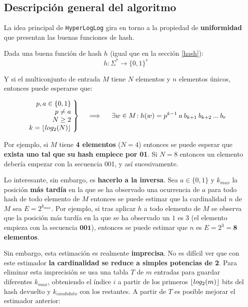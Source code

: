 \subsection{Descripción general del algoritmo}
\label{investigacion:descripcion}

La idea principal de \texttt{HyperLogLog} gira en torno a la propiedad de \textbf{uniformidad} que presentan las buenas
funciones de hash.

Dada una buena función de hash $h$ (igual que en la sección \ref{hash}):
$$h: \Sigma^* \rightarrow \{0,1\}^r$$

Y si el multiconjunto de entrada $M$ tiene $N$ elementos y $n$ elementos únicos, entonces puede esperarse que:

\begin{align*}
  \left.\begin{array}{r@{\mskip\thickmuskip}l}
    p, a \in \{0, 1\} \\
    p \neq a \\
    N \geq 2 \\
    k = \floor{log_2(N)}
  \end{array} \right\}
  \quad \implies \quad
  \left.
    \exists{w \in M}\!: h(w) = p^{k-1} \: a \: b_{k+1} \: b_{k+2} \: ... \: b_r
  \right.
\end{align*}

Por ejemplo, si $M$ tiene \textbf{4 elementos} ($N = 4$) entonces se puede esperar que \textbf{exista uno tal que su hash
empiece por 01}. Si $N = 8$ entonces un elemento debería empezar con la secuencia 001, y así sucesivamente.

Lo interesante, sin embargo, es \textbf{hacerlo a la inversa}.
Sea $a \in \{0, 1\}$ y $k_{max}$ la posición \textbf{más tardía} en la que se ha observado
una ocurrencia de $a$ para todo hash de todo elemento de $M$ entonces se puede estimar que la cardinalidad $n$ de $M$ sea $E = 2^{k_{max}}$.
Por ejemplo, si tras aplicar $h$ a todo elemento de $M$ se observa que la posición más tardía en la que se ha observado un
$1$ es 3 (el elemento empieza con la secuencia $\textbf{001}$), entonces se puede estimar que $n$ es $E = 2^3 = \textbf{8}$ \textbf{elementos}.

Sin embargo, esta estimación es realmente \textbf{imprecisa}. No es difícil ver que con este estimador
\textbf{la cardinalidad se reduce a simples potencias de 2}. Para eliminar esta imprecisión se usa una tabla $T$ de $m$ entradas
para guardar diferentes $k_{max}$, obteniendo el índice $i$ a partir de los primeros $\lfloor log_2(m)\rfloor$ bits del hash devuelto
y $k_{candidato}$ con los restantes. A partir de $T$ es posible mejorar el estimador anterior:

